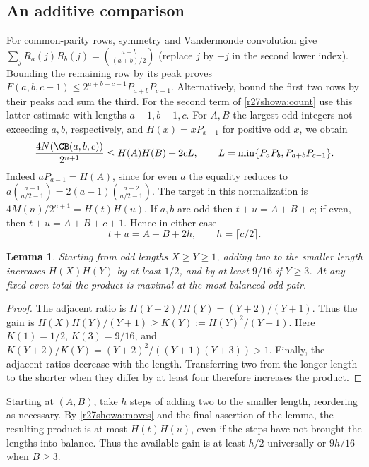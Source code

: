 \documentclass[11pt,a4paper]{article}
\numberwithin{equation}{section}
\newtheorem{lemma}[theorem]{Lemma}
\theoremstyle{definition}
\theoremstyle{remark}
\begin{document}
\subsection{An additive comparison}
For common-parity rows, symmetry and Vandermonde convolution give
$\sum_j R_a(j)R_b(j)=\binom{a+b}{(a+b)/2}$ (replace $j$ by $-j$ in
the second lower index). Bounding the remaining row by its peak proves
$F(a,b,c-1)\le 2^{a+b+c-1}P_{a+b}P_{c-1}$. Alternatively,
bound the first two rows by their peaks and sum the third. For the second
term of \eqref{r27showa:count} use this latter estimate with lengths $a-1,b-1,c$.
For $A,B$ the largest odd integers not exceeding $a,b$, respectively, and
$H(x)=xP_{x-1}$ for positive odd $x$, we obtain
\begin{equation}\label{r27showa:estimate}
 \frac{4N(\CB(a,b,c))}{2^{n+1}}
 \le H(A)H(B)+2cL,\qquad L=\min\{P_aP_b,P_{a+b}P_{c-1}\}.
\end{equation}
Indeed $aP_{a-1}=H(A)$, since for even $a$ the equality reduces to
$a\binom{a-1}{a/2-1}=2(a-1)\binom{a-2}{a/2-1}$.
The target in this normalization is $4M(n)/2^{n+1}=H(t)H(u)$.
If $a,b$ are odd then $t+u=A+B+c$; if even, then
$t+u=A+B+c+1$. Hence in either case
\begin{equation}\label{r27showa:moves}
 t+u=A+B+2h,\qquad h=\lceil c/2\rceil .
\end{equation}
\begin{lemma}\label{r27showa:increment}
Starting from odd lengths $X\ge Y\ge1$, adding two to the smaller
length increases $H(X)H(Y)$ by at least $1/2$, and by at least $9/16$ if
$Y\ge3$. At any fixed even total the product is maximal at the most
balanced odd pair.
\end{lemma}
\begin{proof}
The adjacent ratio is $H(Y+2)/H(Y)=(Y+2)/(Y+1)$. Thus the gain is
$H(X)H(Y)/(Y+1)\ge K(Y):=H(Y)^2/(Y+1)$.
Here $K(1)=1/2$, $K(3)=9/16$, and
$K(Y+2)/K(Y)=(Y+2)^2/((Y+1)(Y+3))>1$.
Finally, the adjacent ratios decrease with the length. Transferring two
from the longer length to the shorter when they differ by at least four
therefore increases the product.
\end{proof}
Starting at $(A,B)$, take $h$ steps of adding two to the smaller length,
reordering as necessary. By \eqref{r27showa:moves} and the final assertion of the
lemma, the resulting product is at most $H(t)H(u)$, even if the steps have
not brought the lengths into balance. Thus the available gain is at least
$h/2$ universally or $9h/16$ when $B\ge3$.
\end{document}
